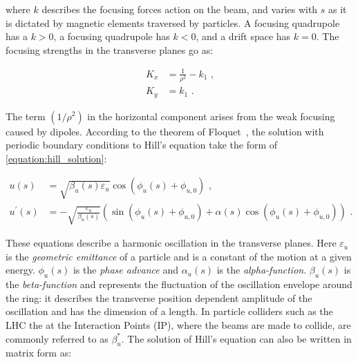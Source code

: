 where \(k\) describes the focusing forces action on the beam, and varies with \(s\) as it is dictated by magnetic elements traversed by particles.
A focusing quadrupole has a \(k > 0\), a focusing quadrupole has \(k < 0\), and a drift space has \(k = 0\).
The focusing strengths in the transverse planes go as:

\begin{equation}
	\begin{aligned}
		K_{x} &= \frac{1}{\rho^2} - k_{1} \text{ ,} \\
    	K_{y} &= k_{1} \text{ .}
	\end{aligned}
    \label{equation:transverse_focusing_strengths}
\end{equation}

The term \(\left(1 / \rho^2\right)\) in the horizontal component arises from the weak focusing caused by dipoles.
According to the theorem of Floquet~\cite{BOOK:Lee:Accelerator_physics}, the solution with periodic boundary conditions to Hill’s equation take the form of \cref{equation:hill_solution}:

\begin{equation}
    \begin{aligned}
        u(s)          &= \sqrt{\beta_{u}(s) \varepsilon_{u}} \cos \left( \phi_{u}(s) + \phi_{u,0} \right) \text{ ,} \\
        u^{\prime}(s) &= -\sqrt{\frac{\varepsilon_u}{\beta_u(s)}} \left( \sin \left(\phi_u(s) + \phi_{u, 0} \right) + \alpha(s) \cos \left( \phi_u(s)+\phi_{u, 0} \right) \right) \text{ .}
    \end{aligned}
    \label{equation:hill_solution}
\end{equation}

These equations describe a harmonic oscillation in the transverse planes.
Here \(\varepsilon_u\) is the \emph{geometric emittance} of a particle and is a constant of the motion at a given energy. 
\(\phi_u(s)\) is the \emph{phase advance} and \(\alpha_u(s)\) is the \emph{alpha-function}.
\(\beta_u(s)\) is the \emph{beta-function} and represents the fluctuation of the oscillation envelope around the ring: it describes the transverse position dependent amplitude of the oscillation and has the dimension of a length.
In particle colliders such as the LHC the \betafunctions at the Interaction Points (IP), where the beams are made to collide, are commonly referred to as \(\beta_u^{\ast}\).
The solution of Hill's equation can also be written in matrix form as:

